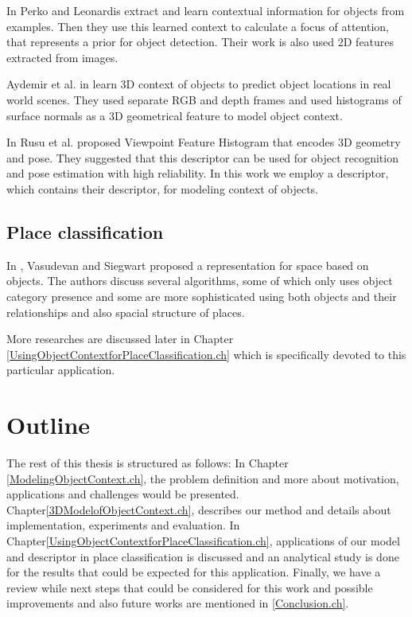      In \cite{PerkoLeonardisContextDriven} Perko and Leonardis extract and learn contextual information for objects from examples.
     Then they use this learned context to calculate a focus of attention, that represents a prior for object detection. Their work is 
     also used 2D features extracted from images. 
 
      Aydemir et al. in \cite{aydemir2012_3Dcontext} learn 3D context of objects to predict object locations in 
      real world scenes. 
      They used separate RGB and depth frames and used histograms of surface normals as a 3D geometrical feature
      to model object context.
      
    In \cite{5651280} Rusu et al. proposed Viewpoint Feature Histogram that encodes 3D geometry and pose. They suggested that this descriptor
    can be used for object recognition and pose estimation with high reliability.
    In this work we employ a descriptor, which contains their descriptor, for modeling context of objects.
     
\subsection*{Place classification}

    In \cite{Vasudevan2008522}, Vasudevan and Siegwart proposed a representation for space based on objects. 
    The authors discuss several algorithms, some of which only uses object category presence and some are more sophisticated using both 
    objects and their relationships and also spacial structure of places.
    
    More researches are discussed later in Chapter \ref{UsingObjectContextforPlaceClassification.ch} which is 
    specifically devoted to this particular application.
     
\section {Outline}
\label{Outline.sec}
The rest of this thesis is structured as follows:
In Chapter \ref{ModelingObjectContext.ch}, the problem definition and more about motivation, applications and challenges would be 
presented.
Chapter\ref{3DModelofObjectContext.ch}, describes our method and details about implementation, experiments and evaluation. 
In Chapter\ref{UsingObjectContextforPlaceClassification.ch}, applications of our model and descriptor in place classification is 
discussed and an analytical study is done for the results that could be expected for this application.
Finally, we have a review while next steps that could be considered for this work and possible improvements 
and also future works are mentioned in \ref{Conclusion.ch}.
